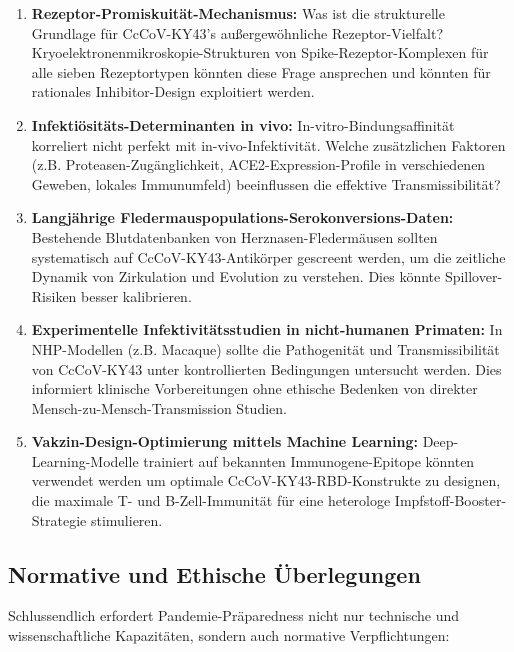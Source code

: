 \documentclass[11pt,a4paper]{article}
\theoremstyle{definition}
\begin{document}
\begin{enumerate}
\item \textbf{Rezeptor-Promiskuität-Mechanismus:} Was ist die strukturelle Grundlage für CcCoV-KY43's außergewöhnliche Rezeptor-Vielfalt? Kryoelektronenmikroskopie-Strukturen von Spike-Rezeptor-Komplexen für alle sieben Rezeptortypen könnten diese Frage ansprechen und könnten für rationales Inhibitor-Design exploitiert werden.

\item \textbf{Infektiösitäts-Determinanten in vivo:} In-vitro-Bindungsaffinität korreliert nicht perfekt mit in-vivo-Infektivität. Welche zusätzlichen Faktoren (z.B. Proteasen-Zugänglichkeit, ACE2-Expression-Profile in verschiedenen Geweben, lokales Immunumfeld) beeinflussen die effektive Transmissibilität?

\item \textbf{Langjährige Fledermauspopulations-Serokonversions-Daten:} Bestehende Blutdatenbanken von Herznasen-Fledermäusen sollten systematisch auf CcCoV-KY43-Antikörper gescreent werden, um die zeitliche Dynamik von Zirkulation und Evolution zu verstehen. Dies könnte Spillover-Risiken besser kalibrieren.

\item \textbf{Experimentelle Infektivitätsstudien in nicht-humanen Primaten:} In NHP-Modellen (z.B. Macaque) sollte die Pathogenität und Transmissibilität von CcCoV-KY43 unter kontrollierten Bedingungen untersucht werden. Dies informiert klinische Vorbereitungen ohne ethische Bedenken von direkter Mensch-zu-Mensch-Transmission Studien.

\item \textbf{Vakzin-Design-Optimierung mittels Machine Learning:} Deep-Learning-Modelle trainiert auf bekannten Immunogene-Epitope könnten verwendet werden um optimale CcCoV-KY43-RBD-Konstrukte zu designen, die maximale T- und B-Zell-Immunität für eine heterologe Impfstoff-Booster-Strategie stimulieren.
\end{enumerate}

\subsection{Normative und Ethische Überlegungen}

Schlussendlich erfordert Pandemie-Präparedness nicht nur technische und wissenschaftliche Kapazitäten, sondern auch normative Verpflichtungen:
\end{document}
